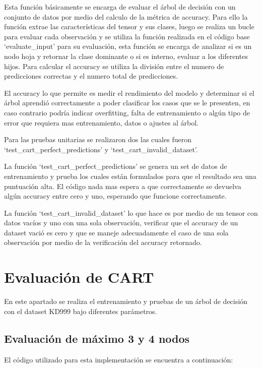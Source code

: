 \documentclass[12pt,a4paper]{article}
\begin{document}
Esta función básicamente se encarga de evaluar el árbol de decisión con un conjunto de datos por medio del calculo de la métrica
de accuracy. Para ello la función extrae las características del tensor y sus clases, luego se realiza un bucle para evaluar cada observación
y se utiliza la función realizada en el código base `evaluate_input' para su evaluación, esta función se encarga de
analizar si es un nodo hoja y retornar la clase dominante o si es interno, evaluar a los diferentes hijos.
Para calcular el accuracy se utiliza la división entre el numero de predicciones correctas y el numero total de predicciones.

El accuracy lo que permite es medir el rendimiento del modelo y determinar si el árbol aprendió correctamente a poder clasificar
los casos que se le presenten, en caso contrario podría indicar overfitting, falta de entrenamiento o algún tipo de error que requiera
mas entrenamiento, datos o ajustes al árbol.

Para las pruebas unitarias se realizaron dos las cuales fueron `test_cart_perfect_predictions' y `test_cart_invalid_dataset'.

La función `test_cart_perfect_predictions' se genera un set de datos de entrenamiento y prueba los cuales están formulados para que el resultado
sea una puntuación alta. El código nada mas espera a que correctamente se devuelva algún accuracy entre cero y uno, esperando que
funcione correctamente.

La función `test_cart_invalid_dataset' lo que hace es por medio de un tensor con datos vacíos y uno con una sola observación,
verificar que el accuracy de un dataset vació es cero y que se maneje adecuadamente el caso de una sola observación por medio
de la verificación del accuracy retornado.

\section{Evaluación de CART}\label{sec:evaluacion-de-cart}

En este apartado se realiza el entrenamiento y pruebas de un árbol de decisión con el dataset KD999 bajo diferentes parámetros.

\subsection{Evaluación de máximo 3 y 4 nodos}\label{subsec:evaluacion-de-maximo-3-y-4-nodos}

El código utilizado para esta implementación se encuentra a continuación:
\end{document}
